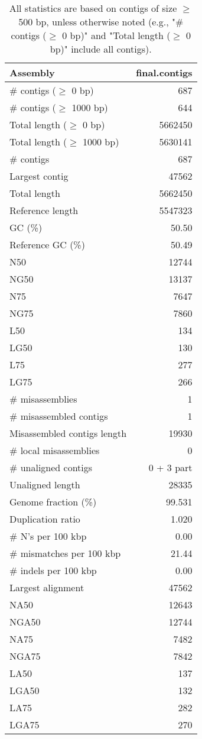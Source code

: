 \documentclass[12pt,a4paper]{article}
\begin{document}
\begin{table}[ht]
\begin{center}
\caption{All statistics are based on contigs of size $\geq$ 500 bp, unless otherwise noted (e.g., "\# contigs ($\geq$ 0 bp)" and "Total length ($\geq$ 0 bp)" include all contigs).}
\begin{tabular}{|l*{1}{|r}|}
\hline
Assembly & final.contigs \\ \hline
\# contigs ($\geq$ 0 bp) & 687 \\ \hline
\# contigs ($\geq$ 1000 bp) & 644 \\ \hline
Total length ($\geq$ 0 bp) & 5662450 \\ \hline
Total length ($\geq$ 1000 bp) & 5630141 \\ \hline
\# contigs & 687 \\ \hline
Largest contig & 47562 \\ \hline
Total length & 5662450 \\ \hline
Reference length & 5547323 \\ \hline
GC (\%) & 50.50 \\ \hline
Reference GC (\%) & 50.49 \\ \hline
N50 & 12744 \\ \hline
NG50 & 13137 \\ \hline
N75 & 7647 \\ \hline
NG75 & 7860 \\ \hline
L50 & 134 \\ \hline
LG50 & 130 \\ \hline
L75 & 277 \\ \hline
LG75 & 266 \\ \hline
\# misassemblies & 1 \\ \hline
\# misassembled contigs & 1 \\ \hline
Misassembled contigs length & 19930 \\ \hline
\# local misassemblies & 0 \\ \hline
\# unaligned contigs & 0 + 3 part \\ \hline
Unaligned length & 28335 \\ \hline
Genome fraction (\%) & 99.531 \\ \hline
Duplication ratio & 1.020 \\ \hline
\# N's per 100 kbp & 0.00 \\ \hline
\# mismatches per 100 kbp & 21.44 \\ \hline
\# indels per 100 kbp & 0.00 \\ \hline
Largest alignment & 47562 \\ \hline
NA50 & 12643 \\ \hline
NGA50 & 12744 \\ \hline
NA75 & 7482 \\ \hline
NGA75 & 7842 \\ \hline
LA50 & 137 \\ \hline
LGA50 & 132 \\ \hline
LA75 & 282 \\ \hline
LGA75 & 270 \\ \hline
\end{tabular}
\end{center}
\end{table}
\end{document}
